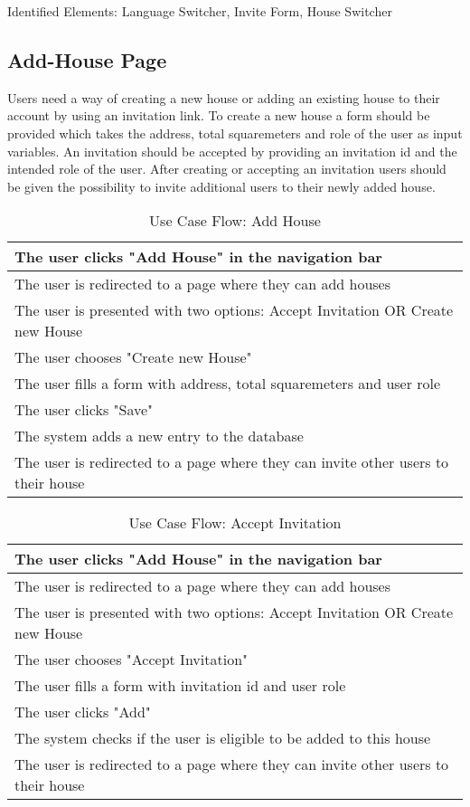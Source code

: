 Identified Elements: Language Switcher, Invite Form, House Switcher

\subsection{Add-House Page}
Users need a way of creating a new house or adding an existing house to their account by using an invitation link. To create a new house a form should be provided which takes the address, total squaremeters and role of the user as input variables. An invitation should be accepted by providing an invitation id and the intended role of the user. After creating or accepting an invitation users should be given the possibility to invite additional users to their newly added house. \newline

\begin{table}[H]
  \begin{tabularx}{\linewidth}{|X|}
    \hline
     The user clicks "Add House" in the navigation bar \\
     \hline
     The user is redirected to a page where they can add houses \\
     \hline
     The user is presented with two options: Accept Invitation OR Create new House \\
     \hline 
     The user chooses "Create new House" \\
     \hline 
     The user fills a form with address, total squaremeters and user role \\
     \hline
     The user clicks "Save" \\
     \hline  
     The system adds a new entry to the database \\
     \hline  
     The user is redirected to a page where they can invite other users to their house \\
     \hline  
  \end{tabularx}
  \caption{Use Case Flow: Add House}
\end{table}

\begin{table}
\begin{tabularx}{\linewidth}{|X|}
  \hline
   The user clicks "Add House" in the navigation bar \\
   \hline
   The user is redirected to a page where they can add houses \\
   \hline
   The user is presented with two options: Accept Invitation OR Create new House \\
   \hline 
   The user chooses "Accept Invitation" \\
   \hline 
   The user fills a form with invitation id and user role \\
   \hline
   The user clicks "Add" \\
   \hline  
   The system checks if the user is eligible to be added to this house \\
   \hline  
   The user is redirected to a page where they can invite other users to their house \\
   \hline  
\end{tabularx}
\caption{Use Case Flow: Accept Invitation}
\end{table}

